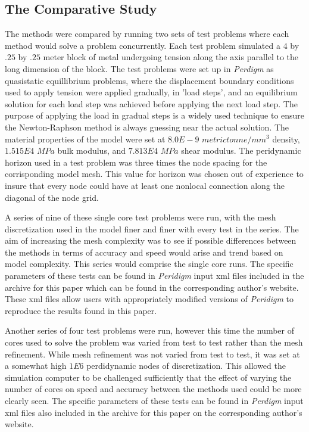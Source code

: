 \documentclass[preprint,12pt]{elsarticle}
\begin{document}
\subsection{The Comparative Study} 
\label{tcs}

The methods were compared by running two sets of test problems where each method would solve a
problem concurrently. Each test problem simulated a $4$ by $.25$ by $.25$ meter block of metal
undergoing tension along the axis parallel to the long dimension of the block. The test problems
were set up in \emph{Perdigm} as quasistatic equillibrium problems, where the displacement boundary
conditions used to apply tension were applied gradually, in 'load steps', and an equilibrium
solution for each load step was achieved before applying the next load step. The purpose of applying
the load in gradual steps is a widely used technique to ensure the Newton-Raphson method is always
guessing near the actual solution. The material properties of the model were set at $8.0E-9$ $ metric
tonne/ mm^3$ density, $1.515E4$ $MPa$ bulk modulus, and $7.813E4$ $MPa$ shear modulus. The peridynamic
horizon used in a test problem was three times the node spacing for the corrisponding model mesh.
This value for horizon was chosen out of experience to insure that every node could have at least
one nonlocal connection along the diagonal of the node grid.

A series of nine of these single core test problems were run, with the mesh discretization used in
the model finer and finer with every test in the series. The aim of increasing the mesh complexity
was to see if possible differences between the methods in terms of accuracy and speed would arise
and trend based on model complexity. This series would comprise the single core runs. The specific
parameters of these tests can be found in \emph{Peridigm} input xml files included in the archive
for this paper which can be found in the corresponding author's website. These xml files allow users
with appropriately modified versions of \emph{Peridigm} to reproduce the results found in this
paper.

Another series of four test problems were run, however this time the number of cores used to solve
the problem was varied from test to test rather than the mesh refinement. While mesh refinement was
not varied from test to test, it was set at a somewhat high $1E6$ perdidynamic nodes of
discretization. This allowed the simulation computer to be challenged sufficiently that the effect
of varying the number of cores on speed and accuracy between the methods used could be more clearly
seen. The specific parameters of these tests can be found in \emph{Perdigm} input xml files also
included in the archive for this paper on the corresponding author's website.
\end{document}
